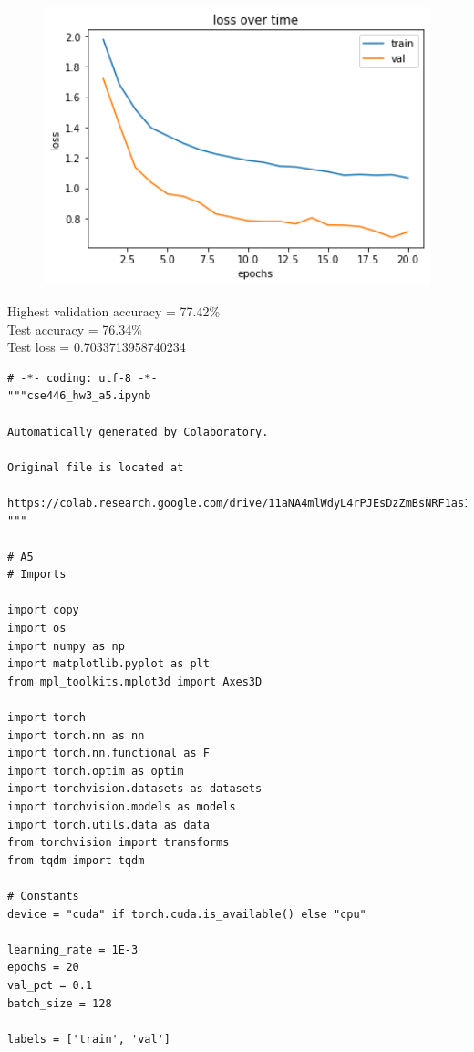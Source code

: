 \documentclass{article}
\newcommand{\1}{\mathbf{1}}
\begin{document}
{\begin{figure}[h]
  \centering
  \includegraphics[width=150mm]{../hw3-code/results/a5/a5_b.png}
\end{figure}

Highest validation accuracy = 77.42\% \\
Test accuracy = 76.34\% \\
Test loss = 0.7033713958740234

\newpage

\begin{verbatim}
# -*- coding: utf-8 -*-
"""cse446_hw3_a5.ipynb

Automatically generated by Colaboratory.

Original file is located at
    https://colab.research.google.com/drive/11aNA4mlWdyL4rPJEsDzZmBsNRF1as1nm
"""

# A5
# Imports

import copy
import os
import numpy as np
import matplotlib.pyplot as plt
from mpl_toolkits.mplot3d import Axes3D

import torch
import torch.nn as nn
import torch.nn.functional as F
import torch.optim as optim
import torchvision.datasets as datasets
import torchvision.models as models
import torch.utils.data as data
from torchvision import transforms
from tqdm import tqdm

# Constants
device = "cuda" if torch.cuda.is_available() else "cpu"

learning_rate = 1E-3
epochs = 20
val_pct = 0.1
batch_size = 128

labels = ['train', 'val']


\end{verbatim}}
\end{document}

